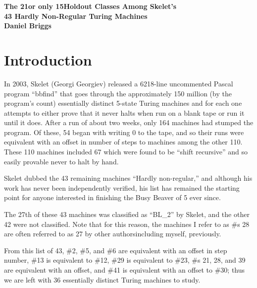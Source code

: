 \documentclass[12pt]{article}
\begin{document}
\begin{center}
 
{\bf\large The 21\textemdash or only 15\textemdash Holdout Classes Among Skelet's\\ 43 Hardly Non-Regular Turing Machines} \\
 
 
 
       \textbf{Daniel Briggs}


\end{center}


\section*{Introduction}
In 2003, Skelet (Georgi Georgiev) released a 6218-line uncommented Pascal program ``bbfind'' that goes through the approximately 150 million (by the program's count) essentially distinct 5-state Turing machines and for each one attempts to either prove that it never halts when run on a blank tape or run it until it does. After a run of about two weeks, only 164 machines had stumped the program. Of these, 54 began with writing 0 to the tape, and so their runs were equivalent with an offset in number of steps to machines among the other 110. These 110 machines included 67 which were found to be ``shift recursive'' and so easily provable never to halt by hand.

Skelet dubbed the 43 remaining machines ``Hardly non-regular,'' and although his work has never been independently verified, his list has remained the starting point for anyone interested in finishing the Busy Beaver of 5 ever since.

The 27th of these 43 machines was classified as ``BL\_2'' by Skelet, and the other 42 were not classified. Note that for this reason, the machines I refer to as \#s 28 are often referred to as 27 by other authors\textemdash including myself, previously.

From this list of 43, \#2, \#5, and \#6 are equivalent with an offset in step number, \#13 is equivalent to \#12,  \#29 is equivalent to \#23, \#s 21, 28, and 39 are equivalent with an offset,  and \#41 is equivalent with an offset to \#30; thus we are left with 36 essentially distinct Turing machines to study.
\end{document}
